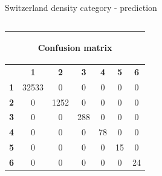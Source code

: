 \documentclass[c]{beamer}
\begin{document}
\begin{frame}
\begin{columns}
\begin{column}{0.5\textwidth}
\begin{overlayarea}{\linewidth}{4cm}
  \end{overlayarea}
  \begin{overlayarea}{\linewidth}{0.5cm}
    \centering
    \tiny Switzerland density category - prediction\par
  \end{overlayarea}
 \end{column}
\end{columns}
\begin{columns}
 \begin{column}{0.5\textwidth}
 \begin{overlayarea}{\linewidth}{2cm}
  \begin{table}
  \begin{center}
  \begin{adjustbox}{max width=0.7\textwidth}
  {\tiny
  \begin{tabular}{|c|c|c|c|c|c|c|}
    \hline
    \multicolumn{7}{|c|}{{\tiny \begin{bf}Confusion matrix\end{bf}}} \\
    \hline
     & \textbf{1} & \textbf{2} & \textbf{3} & \textbf{4} & \textbf{5} & \textbf{6}\\
    \hline
    \textbf{1} & 32533 & 0 & 0 & 0 & 0 & 0\\
    \hline
    \textbf{2} & 0 & 1252 & 0 & 0 & 0 & 0\\
    \hline
    \textbf{3} & 0 & 0 & 288 & 0 & 0 & 0\\
    \hline
    \textbf{4} & 0 & 0 & 0 & 78 & 0 & 0\\
    \hline
    \textbf{5} & 0 & 0 & 0 & 0 & 15 & 0\\
    \hline
    \textbf{6} & 0 & 0 & 0 & 0 & 0 & 24\\
    \hline
  \end{tabular}
  }
  \end{adjustbox}
  \end{center}
  \end{table}
 \end{overlayarea}
 \end{column}
 \begin{column}{0.5\textwidth}
 \begin{overlayarea}{\linewidth}{2cm}
  \begin{table}
    \begin{center}
    \begin{adjustbox}{max width=0.4\textwidth}
    {\tiny 
    \begin{tabular}{|c|c|}
      \hline

\end{tabular}}
\end{adjustbox}
\end{center}
\end{table}
\end{overlayarea}
\end{column}
\end{columns}
\end{frame}
\end{document}
